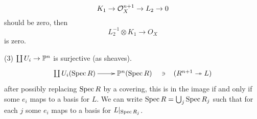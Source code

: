 \begin{example}
  \[
   K_1 \to \mathcal{O}_X^{n+1}\to L_2\to 0
  \]
  should be zero, then
  \[
   L_2^{-1}\otimes K_1\to O_X
  \]
  is zero.

  (3) $\coprod U_i\to \mathbb{P}^n$ is surjective (as sheaves).
  \[\xymatrix{
   \coprod U_i(\spec R) \ar[r] & \PP^n(\spec R) \ar@{}[r]|{\ni}
   & (R^{n+1}\twoheadrightarrow L)
  }\]
  after possibly replacing $\operatorname{Spec} R$ by a covering, this is in the image if and only if
  some $e_i$ maps to a basis for $L$. We can write $\operatorname{Spec} R = \bigcup_j \operatorname{Spec} R_j$ such
  that for each $j$ some $e_i$ maps to a basis for $L|_{\operatorname{Spec} R_j}$.
\end{example}
